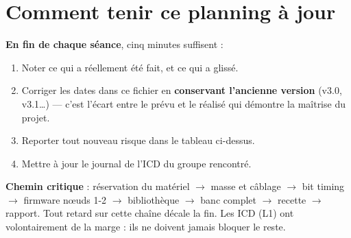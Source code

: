 \documentclass[10pt,a4paper,landscape]{article}
\begin{document}
\vspace{10pt}

\section*{Comment tenir ce planning à jour}

\noindent
\begin{minipage}{\textwidth}
\small
\textbf{En fin de chaque séance}, cinq minutes suffisent :

\begin{enumerate}\itemsep2pt
  \item Noter ce qui a réellement été fait, et ce qui a glissé.
  \item Corriger les dates dans ce fichier en \textbf{conservant l'ancienne version} (v3.0, v3.1\ldots) — c'est l'écart entre le prévu et le réalisé qui démontre la maîtrise du projet.
  \item Reporter tout nouveau risque dans le tableau ci-dessus.
  \item Mettre à jour le journal de l'ICD du groupe rencontré.
\end{enumerate}

\medskip
\textbf{Chemin critique} : réservation du matériel $\rightarrow$ masse et câblage $\rightarrow$ bit timing $\rightarrow$ firmware nœuds 1-2 $\rightarrow$ bibliothèque $\rightarrow$ banc complet $\rightarrow$ recette $\rightarrow$ rapport.
Tout retard sur cette chaîne décale la fin. Les ICD (L1) ont volontairement de la marge : ils ne doivent jamais bloquer le reste.
\normalsize
\end{minipage}
\end{document}
